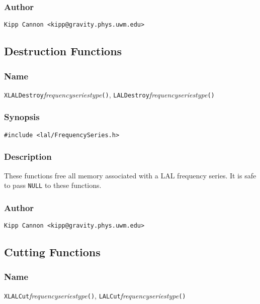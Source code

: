 \subsubsection{Author}

\verb|Kipp Cannon <kipp@gravity.phys.uwm.edu>|


\subsection{Destruction Functions}

\subsubsection{Name}

\texttt{XLALDestroy}\textit{frequencyseriestype}\texttt{()},
\texttt{LALDestroy}\textit{frequencyseriestype}\texttt{()}

\subsubsection{Synopsis}

\begin{verbatim}
#include <lal/FrequencySeries.h>
\end{verbatim}


\subsubsection{Description}

These functions free all memory associated with a LAL frequency series.  It
is safe to pass \texttt{NULL} to these functions.

\subsubsection{Author}

\verb|Kipp Cannon <kipp@gravity.phys.uwm.edu>|


\subsection{Cutting Functions}

\subsubsection{Name}

\texttt{XLALCut}\textit{frequencyseriestype}\texttt{()},
\texttt{LALCut}\textit{frequencyseriestype}\texttt{()}


